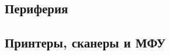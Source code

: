 \subsection{Периферия}\label{base:introduction:components:peripheral}


\subsection{Принтеры, сканеры и МФУ}\label{base:introduction:components:printers}

